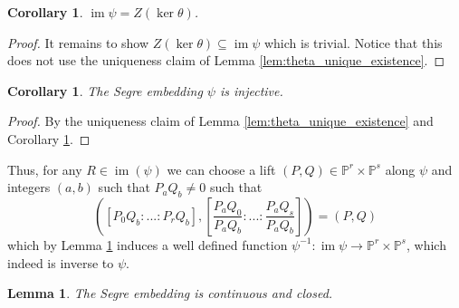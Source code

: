 \documentclass[12pt]{article}
\theoremstyle{plain}
\newtheorem{lemma}[thm]{Lemma}
\newtheorem{cor}[thm]{Corollary}
\theoremstyle{definition}
\newcommand{\bb}[1]{\mathbb{#1}}
\newcommand{\lto}{\longrightarrow}
\begin{document}
\begin{cor}\label{cor:segre_image_kernel}
$\operatorname{im}\psi = Z(\operatorname{ker}\theta)$.
\end{cor}
\begin{proof}
It remains to show $Z(\operatorname{ker}\theta) \subseteq \operatorname{im}\psi$ which is trivial. Notice that this does not use the uniqueness claim of Lemma \ref{lem:theta_unique_existence}.
\end{proof}
\begin{cor}\label{cor:segre_injectivity}
The Segre embedding $\psi$ is injective.
\end{cor}
\begin{proof}
By the uniqueness claim of Lemma \ref{lem:theta_unique_existence} and Corollary \ref{cor:segre_image_kernel}.
\end{proof}
Thus, for any $R \in \operatorname{im}(\psi)$ we can choose a lift $(P,Q) \in \bb{P}^r \times \bb{P}^s$ along $\psi$ and integers $(a,b)$ such that $P_aQ_b \neq 0$ such that
\begin{equation}
    ([P_{0}Q_b:...:P_{r}Q_b],[\frac{P_aQ_0}{P_aQ_b}:...:\frac{P_aQ_s}{P_aQ_b}]) = (P,Q)
\end{equation}
which by Lemma \ref{cor:segre_injectivity} induces a well defined function $\psi^{-1}: \operatorname{im}\psi \lto \bb{P}^r \times \bb{P}^s$, which indeed is inverse to $\psi$.
\begin{lemma}\label{lem:segre_continuous}
The Segre embedding is continuous and closed.
\end{lemma}
\end{document}
